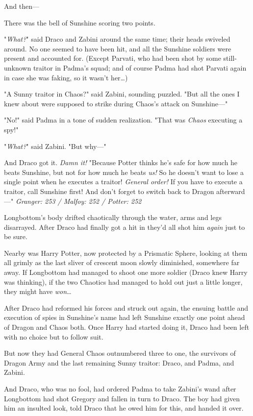 And then---

There was the bell of Sunshine scoring two points.

"\emph{What?}" said Draco and Zabini around the same time; their heads swiveled
around. No one seemed to have been hit, and all the Sunshine soldiers were
present and accounted for. (Except Parvati, who had been shot by some
still-unknown traitor in Padma's squad; and of course Padma had shot Parvati
again in case she was faking, so it wasn't her…)

"A Sunny traitor in Chaos?" said Zabini, sounding puzzled. "But all the ones I
knew about were supposed to strike during Chaos's attack on Sunshine---"

"No!" said Padma in a tone of sudden realization. "That was \emph{Chaos}
executing a spy!"

"\emph{What?}" said Zabini. "But why---"

And Draco got it. \emph{Damn it!} "Because Potter thinks he's safe for how much
he beats Sunshine, but not for how much he beats \emph{us!} So he doesn't want
to lose a single point when he executes a traitor! \emph{General order!} If you
have to execute a traitor, call Sunshine first! And don't forget to switch back
to Dragon afterward---"
\later
\emph{Granger: 253 / Malfoy: 252 / Potter: 252}

Longbottom's body drifted chaotically through the water, arms and legs
disarrayed. After Draco had finally got a hit in they'd all shot him
\emph{again} just to be sure.

Nearby was Harry Potter, now protected by a Prismatic Sphere, looking at them
all grimly as the last sliver of crescent moon slowly diminished, somewhere far
away. If Longbottom had managed to shoot one more soldier (Draco knew Harry was
thinking), if the two Chaotics had managed to hold out just a little longer,
they might have \emph{won}…

After Draco had reformed his forces and struck out again, the ensuing battle
and execution of spies in Sunshine's name had left Sunshine exactly one point
ahead of Dragon and Chaos both. Once Harry had started doing it, Draco had been
left with no choice but to follow suit.

But now they had General Chaos outnumbered three to one, the survivors of
Dragon Army and the last remaining Sunny traitor: Draco, and Padma, and Zabini.

And Draco, who was no fool, had ordered Padma to take Zabini's wand after
Longbottom had shot Gregory and fallen in turn to Draco. The boy had given him
an insulted look, told Draco that he owed him for this, and handed it over.


